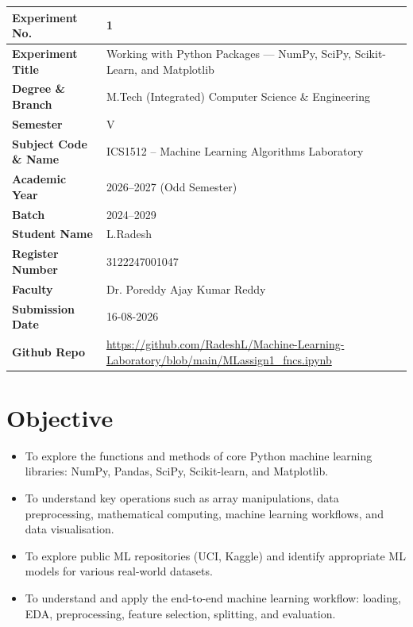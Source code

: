 \documentclass[12pt,a4paper]{article}
\begin{document}

\begin{tabular}{|p{4.5cm}|p{10.5cm}|}
\hline
\textbf{Experiment No.}       & 1 \\ \hline
\textbf{Experiment Title}     & Working with Python Packages --- NumPy, SciPy,
                                Scikit-Learn, and Matplotlib%
 \\ \hline
\textbf{Degree \& Branch}     & M.Tech (Integrated) Computer Science \& Engineering \\ \hline
\textbf{Semester}             & V \\ \hline
\textbf{Subject Code \& Name} & ICS1512 -- Machine Learning Algorithms Laboratory \\ \hline
\textbf{Academic Year}        & 2026--2027 (Odd Semester) \\ \hline
\textbf{Batch}                & 2024--2029 \\ \hline
\textbf{Student Name}         & L.Radesh\\ \hline
\textbf{Register Number}      & 3122247001047\\ \hline
\textbf{Faculty}              & Dr. Poreddy Ajay Kumar Reddy \\ \hline
\textbf{Submission Date}      & 16-08-2026 \\ \hline
\textbf{Github Repo}  & \url{https://github.com/RadeshL/Machine-Learning-Laboratory/blob/main/MLassign1_fncs.ipynb}\\ \hline
\end{tabular}


\section{Objective}
\begin{itemize}[noitemsep]
  \item To explore the functions and methods of core Python machine learning libraries:
        NumPy, Pandas, SciPy, Scikit-learn, and Matplotlib.
  \item To understand key operations such as array manipulations, data preprocessing,
        mathematical computing, machine learning workflows, and data visualisation.
  \item To explore public ML repositories (UCI, Kaggle) and identify appropriate
        ML models for various real-world datasets.
  \item To understand and apply the end-to-end machine learning workflow: loading,
        EDA, preprocessing, feature selection, splitting, and evaluation.
\end{itemize}
\end{document}
